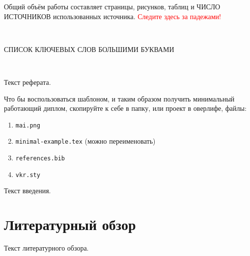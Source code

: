 \documentclass[a4paper, 14pt]{extreport}
\begin{document}






\vkrAbstract
    
Общий объём работы составляет \ztotpages{} страницы, \totalfigures{} рисунков, \totaltables{} таблиц и ЧИСЛО ИСТОЧНИКОВ использованных источника. \textcolor{red}{Следите здесь за падежами!}

~

СПИСОК КЛЮЧЕВЫХ СЛОВ БОЛЬШИМИ БУКВАМИ

~

Текст реферата.

Что бы воспользоваться шаблоном, и таким образом получить минимальный работающий диплом, скопируйте к себе в папку, или проект в оверлифе, файлы:
\begin{enumerate}
    \item \texttt{mai.png}
    \item \texttt{minimal-example.tex} (можно переименовать)
    \item \texttt{references.bib}
    \item \texttt{vkr.sty}
\end{enumerate}






\vkrIntroduction

Текст введения.





\vkrMain

\section{Литературный обзор}

Текст литературного обзора.

\nocite{duportail:alu}
\nocite{althusser:iia}
\nocite{husserl:pd}
\nocite{husserl:sbe}
\end{document}

